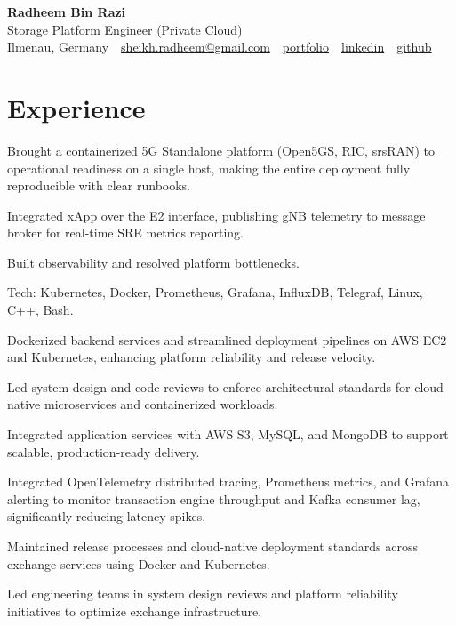 \documentclass[10pt,a4paper]{resume}
\makeatletter
\newcommand{\Portfolio}{https://radheem.github.io/my-cv}
\newcommand{\PortfolioText}{portfolio}
\newcommand{\GitHub}{https://github.com/radheem}
\newcommand{\LinkedIn}{https://www.linkedin.com/in/radheem-razi}
\newcommand{\Email}{sheikh.radheem@gmail.com}
\makeatother
\begin{document}
\begin{center}
  {\huge\bfseries Radheem Bin Razi}\\[3pt]
  {\large Storage Platform Engineer (Private Cloud)}\\[6pt]
  \small
  Ilmenau, Germany \,\textbar\,
  \href{mailto:\Email}{\Email} \,\textbar\,
  \href{\Portfolio}{\PortfolioText} \,\textbar\,
  \href{\LinkedIn}{linkedin} \,\textbar\,
  \href{\GitHub}{github}
\end{center}
\vspace{2pt}

\section{Experience}

\bullets
  \item Brought a containerized 5G Standalone platform (Open5GS, RIC, srsRAN) to operational readiness on a single host, making the entire deployment fully reproducible with clear runbooks.
  \item Integrated xApp over the E2 interface, publishing gNB telemetry to message broker for real-time SRE metrics reporting.
  \item Built observability and resolved platform bottlenecks.
  \item Tech: Kubernetes, Docker, Prometheus, Grafana, InfluxDB, Telegraf, Linux, C++, Bash.
\bulletsend
\vspace{1.5pt}
\bullets
  \item Dockerized backend services and streamlined deployment pipelines on AWS EC2 and Kubernetes, enhancing platform reliability and release velocity.
  \item Led system design and code reviews to enforce architectural standards for cloud-native microservices and containerized workloads.
  \item Integrated application services with AWS S3, MySQL, and MongoDB to support scalable, production-ready delivery.
\bulletsend
\vspace{1.5pt}
\bullets
  \item Integrated OpenTelemetry distributed tracing, Prometheus metrics, and Grafana alerting to monitor transaction engine throughput and Kafka consumer lag, significantly reducing latency spikes.
  \item Maintained release processes and cloud-native deployment standards across exchange services using Docker and Kubernetes.
  \item Led engineering teams in system design reviews and platform reliability initiatives to optimize exchange infrastructure.
\bulletsend
\vspace{1.5pt}
\end{document}
